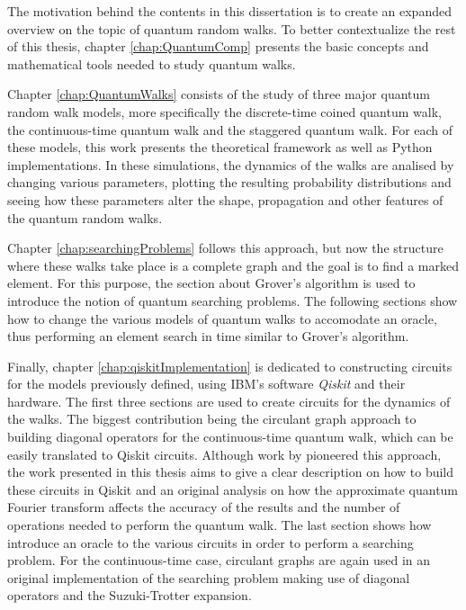 \documentclass[../../dissertation.tex]{subfiles}
\begin{document}
The motivation behind the contents in this dissertation is to create an
expanded overview on  the topic of quantum random walks. To better
contextualize the rest of this thesis, chapter \ref{chap:QuantumComp} presents
the basic concepts and mathematical tools needed to study quantum walks. \par

Chapter \ref{chap:QuantumWalks} consists of the study of three major quantum
random walk models, more specifically the discrete-time coined quantum walk,
the continuous-time quantum walk and the staggered quantum walk. For each of
these models, this work presents the theoretical framework as well as Python
implementations. In these simulations, the dynamics of the walks are analised
by changing various parameters, plotting the resulting probability
distributions and seeing how these parameters alter the shape, propagation and
other features of the quantum random walks.\par

Chapter \ref{chap:searchingProblems} follows this approach, but now the
structure where these walks take place is a complete graph and the goal is to
find a marked element. For this purpose, the section about Grover's algorithm
is used to introduce the notion of quantum searching problems. The following
sections show how to change the various models of quantum walks to accomodate
an oracle, thus performing an element search in time similar to Grover's
algorithm. \par

Finally, chapter \ref{chap:qiskitImplementation} is dedicated to constructing
circuits for the models previously defined, using IBM's software
\textit{Qiskit} and their hardware. The first three sections are used to create
circuits for the dynamics of the walks. The biggest contribution being the
circulant graph approach to building diagonal operators for the continuous-time
quantum walk, which can be easily translated to Qiskit circuits. Although work
by \cite{qiang2016} pioneered this approach, the work presented in this thesis
aims to give a clear description on how to build these circuits in Qiskit and
an original analysis on how the approximate quantum Fourier transform affects
the accuracy of the results and the number of operations needed to perform the
quantum walk.
The last section shows how introduce an oracle to the various circuits in order
to perform a searching problem. For the continuous-time case, circulant graphs
are again used in an original implementation of the searching problem making
use of diagonal operators and the Suzuki-Trotter expansion.
\end{document}
